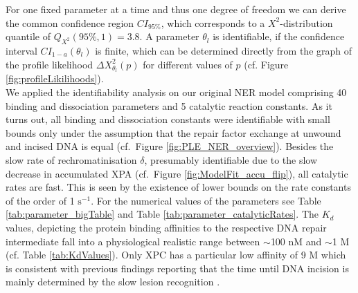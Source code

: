 For one fixed parameter at a time and thus one degree of freedom we can derive the common confidence region $CI_{95\%}$, which corresponds to a $X^2$-distribution quantile of $Q_{X^2}(95\%,1)=3.8$. A parameter $\theta_l$ is identifiable, if the confidence interval $CI_{1-a}(\theta_l)$ is finite, which can be determined directly from the graph of the profile likelihood $\Delta X_{\theta_l}^2(p)$ for different values of $p$ (cf. Figure \ref{fig:profileLikilihoods}).\\ 
We applied the identifiability analysis on our original NER model comprising 40 binding and dissociation parameters and 5 catalytic reaction constants. As it turns out, all binding and dissociation constants were identifiable with small bounds only under the assumption that the repair factor exchange at unwound and incised DNA is equal (cf.\ Figure \ref{fig:PLE_NER_overview}). Besides the slow rate of rechromatinisation $\delta$, presumably identifiable due to the slow decrease in accumulated XPA (cf.\ Figure \ref{fig:ModelFit_accu_flip}), all catalytic rates are fast. This is seen by the existence of lower bounds on the rate constants of the order of 1 $\text{s}^{-1}$. For the numerical values of the parameters see Table \ref{tab:parameter_bigTable} and Table \ref{tab:parameter_catalyticRates}.
The $K_d$ values, depicting the protein binding affinities to the respective DNA repair intermediate fall into a physiological realistic range between $\sim$100 nM and $\sim$1 \textmu M (cf. Table \ref{tab:KdValues}). Only XPC has a particular low affinity of 9 \textmu M which is consistent with previous findings reporting that the time until DNA incision is mainly determined by the slow lesion recognition \cite{Luijsterburg2010}.        


